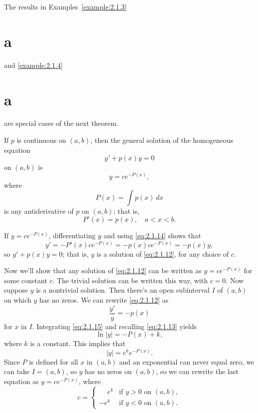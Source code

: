The results in Examples~\ref{example:2.1.3}\part{a} and \ref{example:2.1.4}\part{a} are special
cases of the next theorem.

\begin{theorem}
  \color{blue}
  \label{thmtype:2.1.1} If $p$ is continuous on $(a,b)$, then the general solution of the
  homogeneous equation
  \begin{equation}
    \label{eq:2.1.12}y'+p(x)y=0
  \end{equation}
  on $(a,b)$ is
  \[
    y=ce^{-P(x)},
  \]
  where
  \begin{equation}
    \label{eq:2.1.13}P(x)=\int p(x)\,dx
  \end{equation}
  is any antiderivative of $p$ on $(a,b)$; that is,
  \begin{equation}
    \label{eq:2.1.14}P'(x)=p(x),\quad a<x<b.
  \end{equation}
\end{theorem}

\proof If $y=ce^{-P(x)}$, differentiating $y$ and using \eqref{eq:2.1.14} shows that
\[
  y'=-P'(x)ce^{-P(x)}=-p(x)ce^{-P(x)}=-p(x)y,
\]
so $y'+p(x)y=0$; that is, $y$ is a solution of \eqref{eq:2.1.12}, for any choice of $c$.

Now we'll show that any solution of \eqref{eq:2.1.12} can be written as $y=ce^{-P(x)}$ for some
constant $c$. The trivial solution can be written this way, with $c=0$. Now suppose $y$ is a
nontrivial solution. Then there's an open subinterval $I$ of $(a,b)$ on which $y$ has no zeros. We
can rewrite \eqref{eq:2.1.12} as
\begin{equation}
  \label{eq:2.1.15}\frac{y'}{y}=-p(x)
\end{equation}
for $x$ in $I$. Integrating \eqref{eq:2.1.15} and recalling \eqref{eq:2.1.13} yields
\[
  \ln|y|=-P(x)+k,
\]
where $k$ is a constant. This implies that
\[
  |y|=e^{k}e^{-P(x)}.
\]
Since $P$ is defined for all $x$ in $(a,b)$ and an exponential can never equal zero, we can take
$I=(a,b)$, so $y$ has no zeros on $(a,b)$, so we can rewrite the last equation as
$y=ce^{-P(x)}$, where
\[
  c=\left\{
  \begin{array}{cl}
    \phantom{-}e^{k} & \mbox{if }y>0\mbox{ on } (a,b), \\
    -e^{k}           & \mbox{if }y<0\mbox{ on }(a,b).
  \end{array}\right.
\]

